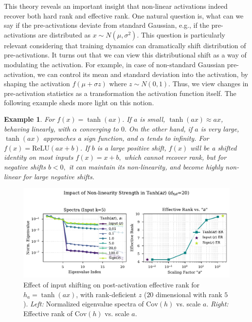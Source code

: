 \documentclass{article}
\newcommand{\ff}[1]{\todo[color=blue!30,size=\tiny]{FF: #1}}
\newtheorem{example}{Example}[section] %
\numberwithin{figure}{section}
\begin{document}
This theory reveals an important insight that non-linear activations indeed recover both hard rank and effective rank.  One natural question is, what can we say if the pre-activations deviate from standard Gaussian, e.g., if the pre-activations are distributed as $x\sim N(\mu,\sigma^2).$ This question is particularly relevant considering that training dynamics can dramatically shift distribution of pre-activations. It turns out that we can view this distributional shift as a way of modulating the activation. For example, in case of non-standard Gaussian pre-activation, we can control its mean and standard deviation into the activation, by shaping the activation $f(\mu + \sigma z)$ where $z\sim N(0,1)$. Thus, we view  changes in pre-activation statistics as a transformation the activation function itself. The following example sheds more light on this notion.

\begin{example}
For $f(x) = \tanh(ax)$. If $a$ is small, $\tanh(ax) \approx ax$, behaving linearly, with $\alpha$ converging to $0.$ On the other hand, if $a$ is very large, $\tanh(ax)$ approaches a sign function, and $\alpha$ tends to infinity.  
For $f(x) = \text{ReLU}(a x + b)$. If $b $ is a large positive shift, $f(x)$ will be a shifted identity on most inputs $f(x) = x+b, $ which cannot recover rank, but for negative shifts $b< 0, $ it can maintain its non-linearity, and become highly non-linear for large negative shifts. 
\end{example}

\begin{figure}[ht!]
    \centering
\includegraphics[width=0.7\linewidth]{POC/figures/theory_tanh_az_rank.pdf} %
    \vspace{-.3cm}
    \caption{Effect of input shifting on post-activation effective rank for $h_a = \tanh(a x)$, with rank-deficient $z$ ($20$ dimensional with rank $5$). \emph{Left:} Normalized eigenvalue spectra of $\mathrm{Cov}(h)$ vs. scale $a.$ \emph{Right:} Effective rank of $\mathrm{Cov}(h)$ vs. scale $a$. }
    \label{fig:theory_tanh_az_rank}
\end{figure}
\end{document}
